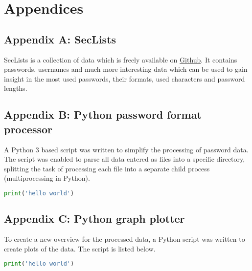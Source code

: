 \documentclass[a4paper,12pt]{article}
\begin{document}
\newpage
\section{Appendices}

\subsection{Appendix A: SecLists}
\label{app:secl}

SecLists is a collection of data which is freely available on \href{https://github.com/danielmiessler/SecLists/}{Github}. It contains passwords, usernames and much more interesting data which can be used to gain insight in the most used passwords, their formats, used characters and password lengths.

\subsection{Appendix B: Python password format processor}
\label{app:pyprocc}

A Python 3 based script was written to simplify the processing of password data. The script was enabled to parse all data entered as files into a specific directory, splitting the task of processing each file into a separate child process (multiprocessing in Python). 

\begin{lstlisting}[language=Python]
  print('hello world')  
\end{lstlisting}

\subsection{Appendix C: Python graph plotter}
\label{app:pyplot}

To create a new overview for the processed data, a Python script was written to create plots of the data. The script is listed below.

\begin{lstlisting}[language=Python]
  print('hello world')  
\end{lstlisting}
\end{document}
